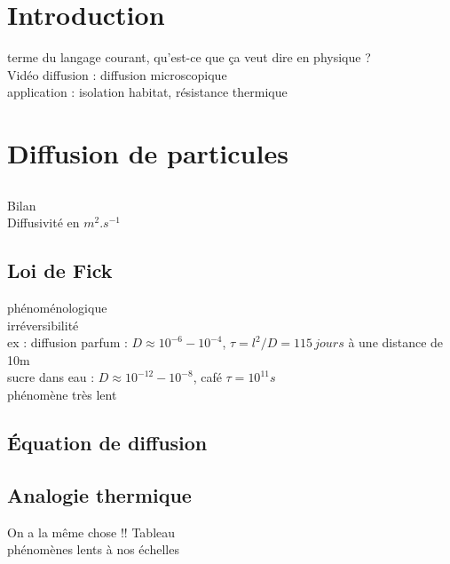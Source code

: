 


\biblio{}

\section*{Introduction}
terme du langage courant, qu'est-ce que ça veut dire en physique ? \\
Vidéo diffusion : diffusion microscopique \\
application : isolation habitat, résistance thermique \\



\section{Diffusion de particules}
\subsection{}
Bilan \\
Diffusivité en $m^{2}.s^{-1}$
\subsection{Loi de Fick}
phénoménologique \\
irréversibilité \\
ex : diffusion parfum : $D\approx10^{-6}-10^{-4}$, $\tau=l^2/D=115\,jours$ à une distance de 10m \\
sucre dans eau : $D\approx10^{-12}-10^{-8}$, café $\tau=10^{11}s$ \\
phénomène très lent
\subsection{Équation de diffusion}


\subsection{Analogie thermique}
On a la même chose !! Tableau \\
phénomènes lents à nos échelles \\

